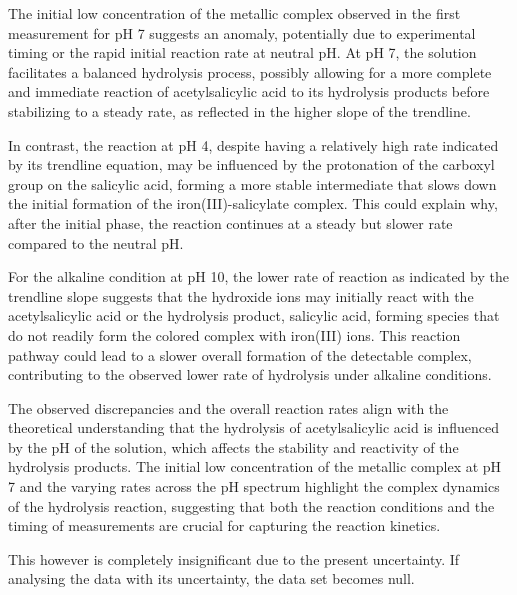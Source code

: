 \documentclass{article}
\begin{document}
The initial low concentration of the metallic complex observed in the first measurement for pH 7 suggests an anomaly, potentially due to experimental timing or the rapid initial reaction rate at neutral pH. At pH 7, the solution facilitates a balanced hydrolysis process, possibly allowing for a more complete and immediate reaction of acetylsalicylic acid to its hydrolysis products before stabilizing to a steady rate, as reflected in the higher slope of the trendline.

In contrast, the reaction at pH 4, despite having a relatively high rate indicated by its trendline equation, may be influenced by the protonation of the carboxyl group on the salicylic acid, forming a more stable intermediate that slows down the initial formation of the iron(III)-salicylate complex. This could explain why, after the initial phase, the reaction continues at a steady but slower rate compared to the neutral pH.

For the alkaline condition at pH 10, the lower rate of reaction as indicated by the trendline slope suggests that the hydroxide ions may initially react with the acetylsalicylic acid or the hydrolysis product, salicylic acid, forming species that do not readily form the colored complex with iron(III) ions. This reaction pathway could lead to a slower overall formation of the detectable complex, contributing to the observed lower rate of hydrolysis under alkaline conditions.

The observed discrepancies and the overall reaction rates align with the theoretical understanding that the hydrolysis of acetylsalicylic acid is influenced by the pH of the solution, which affects the stability and reactivity of the hydrolysis products. The initial low concentration of the metallic complex at pH 7 and the varying rates across the pH spectrum highlight the complex dynamics of the hydrolysis reaction, suggesting that both the reaction conditions and the timing of measurements are crucial for capturing the reaction kinetics.

This however is completely insignificant due to the present uncertainty. If analysing the data with its uncertainty, the data set becomes null.
\end{document}
